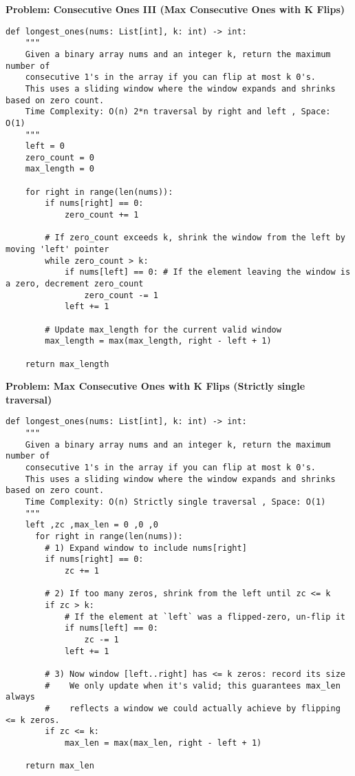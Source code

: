 \noindent\textbf{Problem: Consecutive Ones III (Max Consecutive Ones with K Flips)}
\begin{verbatim}
def longest_ones(nums: List[int], k: int) -> int:
    """
    Given a binary array nums and an integer k, return the maximum number of
    consecutive 1's in the array if you can flip at most k 0's.
    This uses a sliding window where the window expands and shrinks based on zero count.
    Time Complexity: O(n) 2*n traversal by right and left , Space: O(1)
    """
    left = 0
    zero_count = 0
    max_length = 0

    for right in range(len(nums)):
        if nums[right] == 0:
            zero_count += 1
        
        # If zero_count exceeds k, shrink the window from the left by moving 'left' pointer
        while zero_count > k:
            if nums[left] == 0: # If the element leaving the window is a zero, decrement zero_count
                zero_count -= 1
            left += 1
        
        # Update max_length for the current valid window
        max_length = max(max_length, right - left + 1)
        
    return max_length
\end{verbatim}
\noindent\textbf{Problem: Max Consecutive Ones with K Flips (Strictly single traversal) }
\begin{verbatim}
def longest_ones(nums: List[int], k: int) -> int:
    """
    Given a binary array nums and an integer k, return the maximum number of
    consecutive 1's in the array if you can flip at most k 0's.
    This uses a sliding window where the window expands and shrinks based on zero count. 
    Time Complexity: O(n) Strictly single traversal , Space: O(1)
    """
    left ,zc ,max_len = 0 ,0 ,0
      for right in range(len(nums)):
        # 1) Expand window to include nums[right]
        if nums[right] == 0:
            zc += 1

        # 2) If too many zeros, shrink from the left until zc <= k
        if zc > k:
            # If the element at `left` was a flipped‐zero, un‐flip it
            if nums[left] == 0:
                zc -= 1
            left += 1

        # 3) Now window [left..right] has <= k zeros: record its size
        #    We only update when it's valid; this guarantees max_len always
        #    reflects a window we could actually achieve by flipping <= k zeros.
        if zc <= k:
            max_len = max(max_len, right - left + 1)

    return max_len

\end{verbatim}
